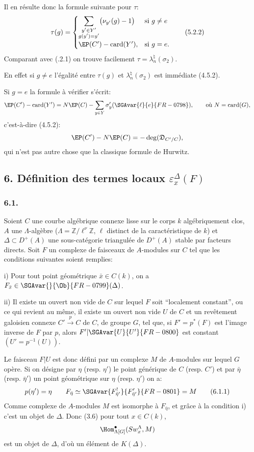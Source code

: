 Il en résulte donc la formule suivante pour $\tau$:
\[
\tau(g)=
\begin{cases}
\displaystyle\sum_{\substack{y'\in Y'\\g(y')=y'}}\bigl(\nu_{y'}(g)-1\bigr)& \text{si } g\ne e\\[0.8em]
\EP(C')-\operatorname{card}(Y'),& \text{si } g=e.
\end{cases}
\tag{5.2.2}
\]
Comparant avec (.2.1) on trouve facilement $\tau=\lambda_n^\natural(\sigma_2)$.

En effet si $g\ne e$ l'égalité entre $\tau(g)$ et $\lambda_n^\natural(\sigma_2)$ est immédiate (4.5.2).

Si $g=e$ la formule à vérifier s'écrit:
\[
\EP(C')-\operatorname{card}(Y')
=
N\EP(C)-\sum_{y\in Y}\sigma'_y(\SGAvar{\ell}{e}{FR-0798}),
\qquad\text{où } N=\operatorname{card}(G),
\]
c'est-à-dire (4.5.2):
\[
\EP(C')-N\EP(C)=-\deg(\mathfrak{D}_{C'/C}),
\]
qui n'est pas autre chose que la classique formule de Hurwitz.

\subsection*{6. Définition des termes locaux $\varepsilon_x^\Delta(F)$}

\subsubsection*{6.1.}

Soient $C$ une courbe algébrique connexe lisse sur le corps $k$ algébriquement clos, $A$ une $\Lambda$-algèbre ($\Lambda=\mathbb{Z}/\ell^\nu\mathbb{Z}$, $\ell$ distinct de la caractéristique de $k$) et $\Delta\subset D^+(A)$ une sous-catégorie triangulée de $D^+(A)$ stable par facteurs directs. Soit $F$ un complexe de faisceaux de $A$-modules sur $C$ tel que les conditions suivantes soient remplies:

i) Pour tout point géométrique $\bar x\in C(k)$, on a $F_{\bar x}\in\SGAvar{}{\Ob}{FR-0799}(\Delta)$.

ii) Il
existe un ouvert non vide de $C$ sur lequel $F$ soit ``localement constant'', ou ce qui revient au même, il existe un ouvert non vide $U$ de $C$ et un revêtement galoisien connexe $C'\xrightarrow{p}C$ de $C$, de groupe $G$, tel que, si $F'=p^*(F)$ est l'image inverse de $F$ par $p$, alors $F'|\SGAvar{U}{U'}{FR-0800}$ est constant $(U'=p^{-1}(U))$.

Le faisceau $F|U$ est donc défini par un complexe $M$ de $A$-modules sur lequel $G$ opère. Si on désigne par $\eta$ (resp. $\eta'$) le point générique de $C$ (resp. $C'$) et par $\bar\eta$ (resp. $\bar\eta'$) un point géométrique sur $\eta$ (resp. $\eta'$) on a:
\[
p(\eta')=\eta\qquad
F_{\bar\eta}\simeq \SGAvar{F^{!}_{\bar\eta'}}{F'_{\bar\eta'}}{FR-0801}=M
\tag{6.1.1}
\]
Comme complexe de $A$-modules $M$ est isomorphe à $F_{\bar\eta}$, et grâce à la condition i) c'est un objet de $\Delta$. Donc (3.6) pour tout $x\in C(k)$,
\[
\Hom^\bullet_{\Lambda[G]}(Sw_x^\Lambda,M)
\]
est un objet de $\Delta$, d'où un élément de $K(\Delta)$.

